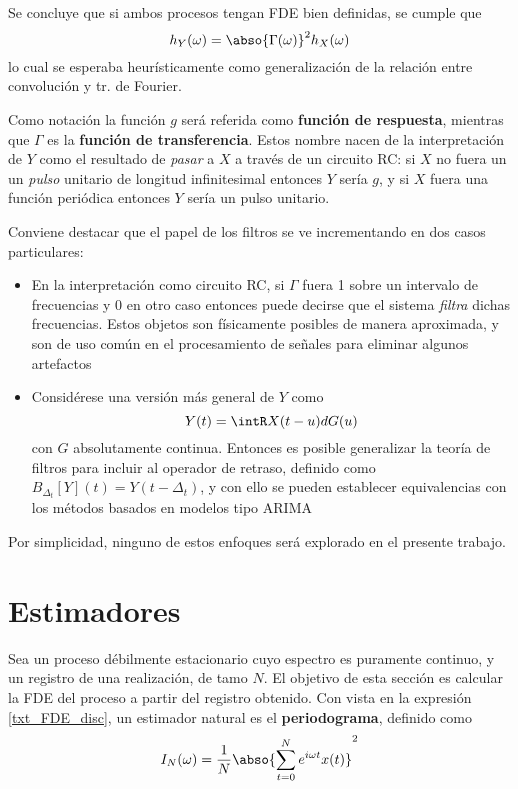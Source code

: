 Se concluye que si ambos procesos tengan FDE bien definidas, se cumple que
\begin{equation}
h_Y(\omega) = \abso{\Gamma(\omega)}^{2} h_X(\omega)
\end{equation}
%
lo cual se esperaba heurísticamente como generalización de la relación entre convolución y tr. de
Fourier.

Como notación la función $g$ será referida como \textbf{función de respuesta}, mientras que 
$\Gamma$ es la \textbf{función de transferencia}. 
%
Estos nombre nacen de la interpretación de $Y$ como el resultado de \textit{pasar} a $X$ a través 
de un circuito RC:
si $X$ no fuera un un \textit{pulso} unitario de longitud infinitesimal entonces $Y$ sería $g$,
y si $X$ fuera una función periódica entonces $Y$ sería un pulso unitario.

Conviene destacar que el papel de los filtros se ve incrementando en dos casos particulares:
\begin{itemize}
\item En la interpretación como circuito RC, si $\Gamma$ fuera 1 sobre un intervalo de frecuencias
y 0 en otro caso entonces puede decirse que el sistema \textit{filtra} dichas frecuencias.
%
Estos objetos son físicamente posibles de manera aproximada, y son de uso común 
en el procesamiento de señales para eliminar algunos artefactos
\item Considérese una versión más general de $Y$ como
\begin{equation}
Y(t) = \intR X(t-u) dG(u)
\end{equation}
con $G$ absolutamente continua. Entonces es posible generalizar la teoría de filtros para incluir
al operador de retraso, definido como $B_{\Delta_t}[Y](t) = Y(t-\Delta_t)$, y con ello se pueden
establecer equivalencias con los métodos basados en modelos tipo ARIMA
\end{itemize}
Por simplicidad, ninguno de estos enfoques será explorado en el presente trabajo.


\section{Estimadores}

Sea \xt un proceso débilmente estacionario cuyo espectro es puramente continuo, y \xtd un registro 
de una realización, de tamo $N$. 
%
El objetivo de esta sección es calcular la FDE del proceso a partir del registro obtenido.
%
Con vista en la expresión \ref{txt_FDE_disc}, un estimador natural es el \textbf{periodograma}, 
definido como
\begin{equation}
I_N(\omega) = \frac{1}{N} \abso{\sum_{t = 0}^{N} e^{i \omega t} x(t)}^{2}
\label{txt_periodograma}
\end{equation}

